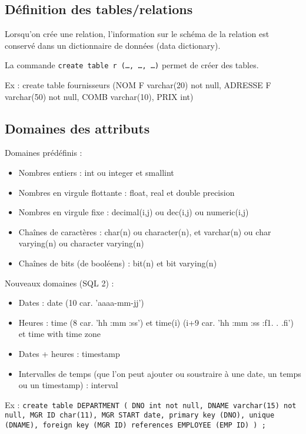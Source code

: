 		\subsection{Définition des tables/relations}
		
		Lorsqu'on crée une relation, l'information sur le schéma de la relation est conservé dans un dictionnaire de données (data dictionary).
		
		La commande \texttt{create table r (\dots , \dots , \dots)} permet de créer des tables.
		
		Ex : create table fournisseurs
(NOM F varchar(20) not null,
ADRESSE F varchar(50) not null,
COMB varchar(10),
PRIX int)

		\subsection{Domaines des attributs}
		
		Domaines prédéfinis :
		
		\begin{itemize}
			\item Nombres entiers : int ou integer et smallint
			\item Nombres en virgule flottante : float, real et double precision
			\item Nombres en virgule fixe : decimal(i,j) ou dec(i,j) ou numeric(i,j)
			\item Chaînes de caractères : char(n) ou character(n), et varchar(n) ou char varying(n) ou character varying(n)
			\item Chaînes de bits (de booléens) : bit(n) et bit varying(n)
		\end{itemize}
		
		Nouveaux domaines (SQL 2) :
		
		\begin{itemize}
		\item Dates : date (10 car. 'aaaa-mm-jj')
		\item Heures : time (8 car. 'hh :mm :ss') et time(i) (i+9 car.
'hh :mm :ss :f1. . .fi') et time with time zone
		\item Dates + heures : timestamp
		\item Intervalles de temps (que l'on peut ajouter ou soustraire à une date, un
temps ou un timestamp) : interval
		\end{itemize}
		
		Ex : \texttt{create table DEPARTMENT
( DNO int not null,
DNAME varchar(15) not null,
MGR ID char(11),
MGR START date,
primary key (DNO),
unique (DNAME),
foreign key (MGR ID) references EMPLOYEE (EMP ID) ) ;}



